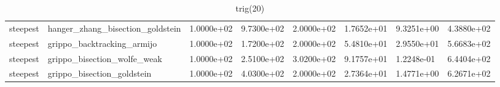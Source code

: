 \documentclass[a4paper,11pt]{article}
\numberwithin{equation}{section} %
\begin{document}
\begin{table}[h!]
{\begin{tabular}{|l|l|l|l|l|l|l|l|}
        steepest & hanger\_zhang\_bisection\_goldstein & 1.0000e+02 & 9.7300e+02 & 2.0000e+02 & 1.7652e+01 & 9.3251e+00 & 4.3880e+02 \\
        steepest & grippo\_backtracking\_armijo & 1.0000e+02 & 1.7200e+02 & 2.0000e+02 & 5.4810e+01 & 2.9550e+01 & 5.6683e+02 \\
        steepest & grippo\_bisection\_wolfe\_weak & 1.0000e+02 & 2.5100e+02 & 3.0200e+02 & 9.1757e+01 & 1.2248e-01 & 6.4404e+02 \\
        steepest & grippo\_bisection\_goldstein & 1.0000e+02 & 4.0300e+02 & 2.0000e+02 & 2.7364e+01 & 1.4771e+00 & 6.2671e+02 \\

\end{tabular}}
\caption{trig(20)}
\label{table:trig(20)}
\end{table}
\end{document}
